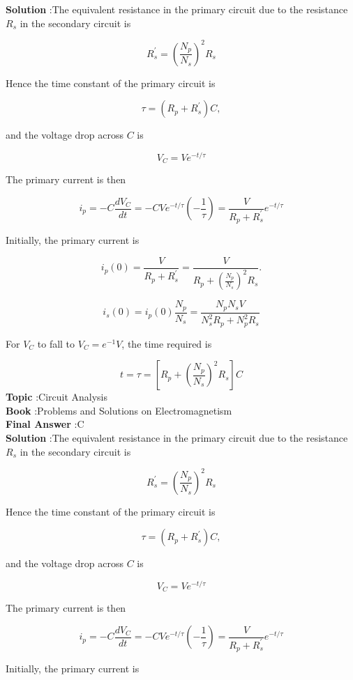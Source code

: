 \documentclass[10pt]{article}
\begin{document}
\textbf{Solution} :The equivalent resistance in the primary circuit due to the resistance $R_{s}$ in the secondary circuit is

$$
R_{s}^{\prime}=\left(\frac{N_{p}}{N_{s}}\right)^{2} R_{s}
$$

Hence the time constant of the primary circuit is

$$
\tau=\left(R_{p}+R_{s}^{\prime}\right) C,
$$

and the voltage drop across $C$ is

$$
V_{C}=V e^{-t / \tau}
$$

The primary current is then

$$
i_{p}=-C \frac{d V_{C}}{d t}=-C V e^{-t / \tau}\left(-\frac{1}{\tau}\right)=\frac{V}{R_{p}+R_{s}^{\prime}} e^{-t / \tau}
$$

Initially, the primary current is

$$
i_{p}(0)=\frac{V}{R_{p}+R_{s}^{\prime}}=\frac{V}{R_{p}+\left(\frac{N_{p}}{N_{s}}\right)^{2} R_{s}} .
$$



$$
i_{s}(0)=i_{p}(0) \frac{N_{p}}{N_{s}}=\frac{N_{p} N_{s} V}{N_{s}^{2} R_{p}+N_{p}^{2} R_{s}}
$$

 For $V_{C}$ to fall to $V_{C}=e^{-1} V$, the time required is

$$
t=\tau=\left[R_{p}+\left(\frac{N_{p}}{N_{s}}\right)^{2} R_{s}\right] C
$$
\textbf{Topic} :Circuit Analysis\\
\textbf{Book} :Problems and Solutions on Electromagnetism\\
\textbf{Final Answer} : C\\


\textbf{Solution} :The equivalent resistance in the primary circuit due to the resistance $R_{s}$ in the secondary circuit is

$$
R_{s}^{\prime}=\left(\frac{N_{p}}{N_{s}}\right)^{2} R_{s}
$$

Hence the time constant of the primary circuit is

$$
\tau=\left(R_{p}+R_{s}^{\prime}\right) C,
$$

and the voltage drop across $C$ is

$$
V_{C}=V e^{-t / \tau}
$$

The primary current is then

$$
i_{p}=-C \frac{d V_{C}}{d t}=-C V e^{-t / \tau}\left(-\frac{1}{\tau}\right)=\frac{V}{R_{p}+R_{s}^{\prime}} e^{-t / \tau}
$$

Initially, the primary current is
\end{document}
